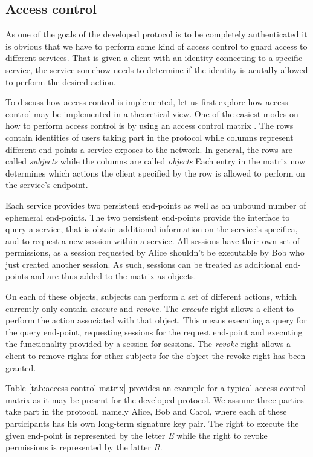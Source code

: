 \subsection{Access control}

As one of the goals of the developed protocol is to be completely authenticated it is obvious that we have to perform some kind of access control to guard access to different services.
That is given a client with an identity connecting to a specific service, the service somehow needs to determine if the identity is acutally allowed to perform the desired action.

To discuss how access control is implemented, let us first explore how access control may be implemented in a theoretical view.
One of the easiest modes on how to perform access control is by using an access control matrix \cite{lampson1974protection,tanenbaum2014modern}.
The rows contain identities of users taking part in the protocol while columns represent different end-points a service exposes to the network.
In general, the rows are called \emph{subjects} while the columns are called \emph{objects}
Each entry in the matrix now determines which actions the client specified by the row is allowed to perform on the service's endpoint.

Each service provides two persistent end-points as well as an unbound number of ephemeral end-points.
The two persistent end-points provide the interface to query a service, that is obtain additional information on the service's specifica, and to request a new session within a service.
All sessions have their own set of permissions, as a session requested by Alice shouldn't be executable by Bob who just created another session.
As such, sessions can be treated as additional end-points and are thus added to the matrix as objects.

On each of these objects, subjects can perform a set of different actions, which currently only contain \emph{execute} and \emph{revoke}.
The \emph{execute} right allows a client to perform the action associated with that object.
This means executing a query for the query end-point, requesting sessions for the request end-point and executing the functionality provided by a session for sessions.
The \emph{revoke} right allows a client to remove rights for other subjects for the object the revoke right has been granted.

Table \ref{tab:access-control-matrix} provides an example for a typical access control matrix as it may be present for the developed protocol.
We assume three parties take part in the protocol, namely Alice, Bob and Carol, where each of these participants has his own long-term signature key pair.
The right to execute the given end-point is represented by the letter \emph{E} while the right to revoke permissions is represented by the latter \emph{R}.

